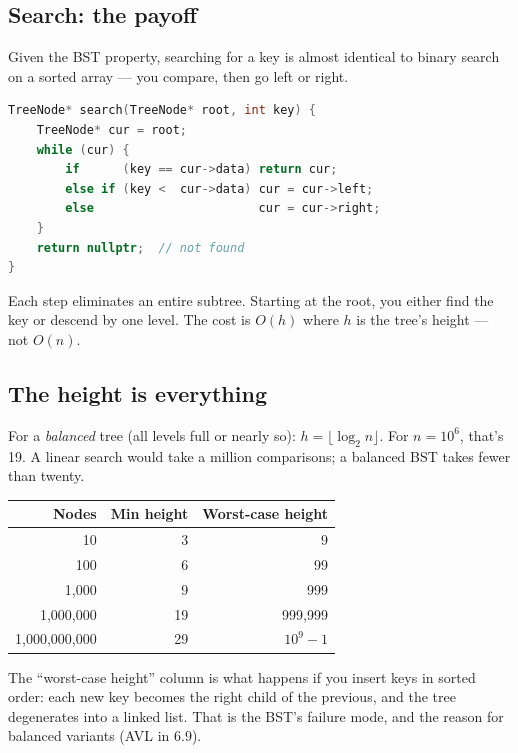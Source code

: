 \documentclass[11pt]{article}
\begin{document}
\subsection*{Search: the payoff}

Given the BST property, searching for a key is almost identical
to binary search on a sorted array --- you compare, then go
left or right.

\begin{examplebox}
\begin{lstlisting}[language=C++,basicstyle=\ttfamily\small,frame=single]
TreeNode* search(TreeNode* root, int key) {
    TreeNode* cur = root;
    while (cur) {
        if      (key == cur->data) return cur;
        else if (key <  cur->data) cur = cur->left;
        else                       cur = cur->right;
    }
    return nullptr;  // not found
}
\end{lstlisting}
\end{examplebox}

Each step eliminates an entire subtree. Starting at the root,
you either find the key or descend by one level. The cost is
$O(h)$ where $h$ is the tree's height --- not $O(n)$.

\subsection*{The height is everything}

For a \emph{balanced} tree (all levels full or nearly so):
$h = \lfloor \log_2 n \rfloor$. For $n = 10^6$, that's 19. A
linear search would take a million comparisons; a balanced BST
takes fewer than twenty.

\begin{center}
\begin{tabular}{|r|r|r|}
\hline
\textbf{Nodes} & \textbf{Min height} & \textbf{Worst-case height} \\
\hline
10              & 3   & 9 \\
100             & 6   & 99 \\
1,000           & 9   & 999 \\
1,000,000       & 19  & 999,999 \\
1,000,000,000   & 29  & $10^9 - 1$ \\
\hline
\end{tabular}
\end{center}

The ``worst-case height'' column is what happens if you insert
keys in sorted order: each new key becomes the right child of
the previous, and the tree degenerates into a linked list. That
is the BST's failure mode, and the reason for balanced variants
(AVL in 6.9).
\end{document}
